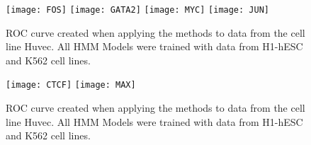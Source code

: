 \documentclass[11pt,a4]{article}
\begin{document}
\begin{figure}[h]
\centering
    \texttt{[image: FOS]}
    \texttt{[image: GATA2]}
    \texttt{[image: MYC]}
    \texttt{[image: JUN]}
\caption{ROC curve created when applying the methods to data from the cell line Huvec. All HMM Models were trained with data from H1-hESC and K562 cell lines.}
\label{fig:roc.Huvec.1}
\end{figure}

\begin{figure}[h]
\centering
    \texttt{[image: CTCF]}
    \texttt{[image: MAX]}
\caption{ROC curve created when applying the methods to data from the cell line Huvec. All HMM Models were trained with data from H1-hESC and K562 cell lines.}
\label{fig:roc.Huvec.2}
\end{figure}
\end{document}
